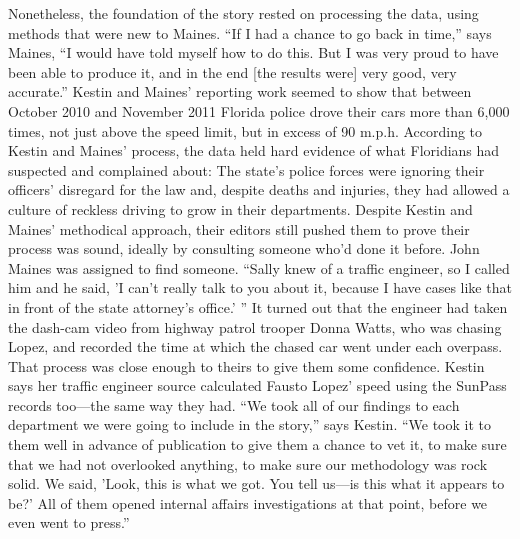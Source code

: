 Nonetheless, the foundation of the story rested on processing the data,
using methods that were new to Maines. ``If I had a chance to go back in
time,'' says Maines, ``I would have told myself how to do this. But I was very
proud to have been able to produce it, and in the end [the results were] very
good, very accurate.''
Kestin and Maines' reporting work seemed to show that between October
2010 and November 2011 Florida police drove their cars more than 6,000
times, not just above the speed limit, but in excess of 90 m.p.h. According to
Kestin and Maines' process, the data held hard evidence of what Floridians
had suspected and complained about: The state's police forces were ignoring
their officers' disregard for the law and, despite deaths and injuries, they
had allowed a culture of reckless driving to grow in their departments.
Despite Kestin and Maines' methodical approach, their editors still pushed
them to prove their process was sound, ideally by consulting someone who'd
done it before. John Maines was assigned to find someone. ``Sally knew of a
traffic engineer, so I called him and he said, 'I can't really talk to you about
it, because I have cases like that in front of the state attorney's office.' '' It
turned out that the engineer had taken the dash-cam video from highway
patrol trooper Donna Watts, who was chasing Lopez, and recorded the
time at which the chased car went under each overpass. That process was
close enough to theirs to give them some confidence. Kestin says her traffic
engineer source calculated Fausto Lopez' speed using the SunPass records
too—the same way they had.
``We took all of our findings to each department we were going to include in
the story,'' says Kestin. ``We took it to them well in advance of publication to
give them a chance to vet it, to make sure that we had not overlooked anything,
to make sure our methodology was rock solid. We said, 'Look, this is
what we got. You tell us—is this what it appears to be?' All of them opened
internal affairs investigations at that point, before we even went to press.''

